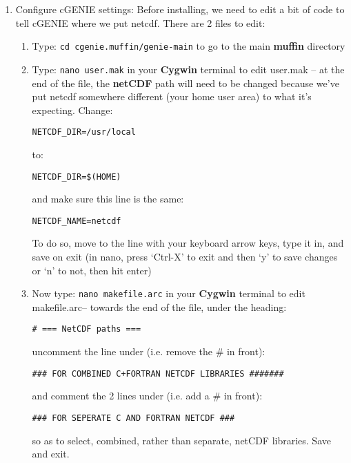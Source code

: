 \documentclass[11pt,fleqn]{book} %
\begin{document}
\begin{enumerate}[noitemsep]
\vspace{2mm}
\item Configure cGENIE settings: Before installing, we need to edit a
  bit of code to tell cGENIE where we put netcdf. There are 2 files to
  edit:
\begin{enumerate}[noitemsep]
\vspace{1mm}
\item Type: \texttt{cd cgenie.muffin/genie-main} to go to the main \textbf{muffin} directory
\vspace{1mm}
\item Type: \texttt{nano user.mak} in your \textbf{Cygwin} terminal to
  edit \textsf{\small user.mak} – at the end of the file, the
  \textbf{netCDF} path will need to be changed because we’ve put
  netcdf somewhere different (your home user area) to what it’s
  expecting. Change:
\begin{verbatim}
NETCDF_DIR=/usr/local
\end{verbatim}
to: 
\begin{verbatim}
NETCDF_DIR=$(HOME)
\end{verbatim}
and make sure this line is the same:
\begin{verbatim}
NETCDF_NAME=netcdf
\end{verbatim}
To do so, move to the line with your keyboard arrow keys, type it in,
and save on exit (in nano, press ‘Ctrl-X’ to exit and then ‘y’ to save
changes or ‘n’ to not, then hit enter)
\vspace{1mm}
\item Now type: \texttt{nano makefile.arc} in your \textbf{Cygwin}
  terminal to edit \textsf{\small makefile.arc}– towards the end of
  the file, under the heading:
\begin{verbatim}
# === NetCDF paths ===
\end{verbatim}
uncomment the line under (i.e. remove the \# in front):
\begin{verbatim}
### FOR COMBINED C+FORTRAN NETCDF LIBRARIES #######
\end{verbatim}
and comment the 2 lines under (i.e. add a \# in front):
\begin{verbatim}
### FOR SEPERATE C AND FORTRAN NETCDF ###
\end{verbatim}
so as to select, combined, rather than separate, netCDF
libraries. Save and exit.
\end{enumerate}


\end{enumerate}
\end{document}
